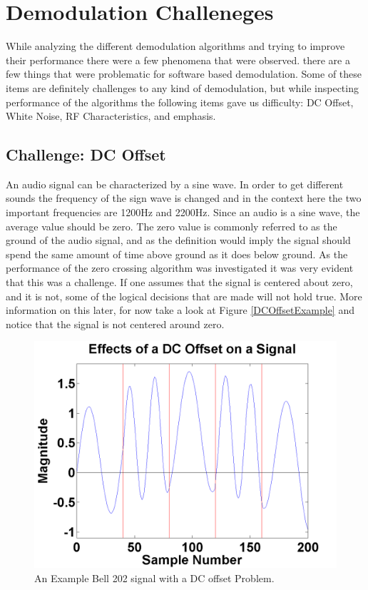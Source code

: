 \chapter{Demodulation Challeneges}
While analyzing the different demodulation algorithms and trying to improve their performance there were a few phenomena that were observed. there are a few things that were problematic for software based demodulation. Some of these items are definitely challenges to any kind of demodulation, but while inspecting performance of the algorithms the following items gave us difficulty: DC Offset, White Noise, RF Characteristics, and emphasis.

\section{Challenge: DC Offset}
An audio signal can be characterized by a sine wave. In order to get different sounds the frequency of the sign wave is changed and in the context here the two important frequencies are 1200Hz and 2200Hz. Since an audio is a sine wave, the average value should be zero. The zero value is commonly referred to as the ground of the audio signal, and as the definition would imply the signal should spend the same amount of time above ground as it does below ground. As the performance of the zero crossing algorithm was investigated it was very evident that this was a challenge. If one assumes that the signal is centered about zero, and it is not, some of the logical decisions that are made will not hold true. More information on this later, for now take a look at Figure \ref{DCOffsetExample} and notice that the signal is not centered around zero.
\begin{figure}
  \centering
	\includegraphics[width=0.75\linewidth]{images/EffectsofaDCOffsetonaSignal.png} 
	\caption{An Example Bell 202 signal with a DC offset Problem.}
   \label{DCOfsetExample}
\end{figure}

